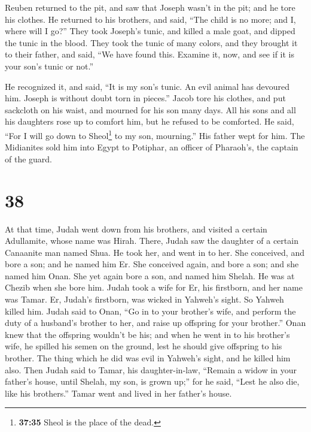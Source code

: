  Reuben returned to the pit, and saw that Joseph wasn't
in the pit; and he tore his clothes.  He returned to his
brothers, and said, ``The child is no more; and I, where will I go?''
 They took Joseph's tunic, and killed a male goat, and
dipped the tunic in the blood.  They took the tunic of
many colors, and they brought it to their father, and said, ``We have
found this. Examine it, now, and see if it is your son's tunic or not.''

 He recognized it, and said, ``It is my son's tunic. An
evil animal has devoured him. Joseph is without doubt torn in pieces.''
 Jacob tore his clothes, and put sackcloth on his waist,
and mourned for his son many days.  All his sons and all
his daughters rose up to comfort him, but he refused to be comforted. He
said, ``For I will go down to Sheol\footnote{\textbf{37:35} Sheol is the
  place of the dead.} to my son, mourning.'' His father wept for him.
 The Midianites sold him into Egypt to Potiphar, an
officer of Pharaoh's, the captain of the guard.

\hypertarget{section-37}{%
\section{38}\label{section-37}}

 At that time, Judah went down from his brothers, and
visited a certain Adullamite, whose name was Hirah. 
There, Judah saw the daughter of a certain Canaanite man named Shua. He
took her, and went in to her.  She conceived, and bore a
son; and he named him Er.  She conceived again, and bore a
son; and she named him Onan.  She yet again bore a son,
and named him Shelah. He was at Chezib when she bore him. 
Judah took a wife for Er, his firstborn, and her name was Tamar.
 Er, Judah's firstborn, was wicked in Yahweh's sight. So
Yahweh killed him.  Judah said to Onan, ``Go in to your
brother's wife, and perform the duty of a husband's brother to her, and
raise up offspring for your brother.''  Onan knew that the
offspring wouldn't be his; and when he went in to his brother's wife, he
spilled his semen on the ground, lest he should give offspring to his
brother.  The thing which he did was evil in Yahweh's
sight, and he killed him also.  Then Judah said to Tamar,
his daughter-in-law, ``Remain a widow in your father's house, until
Shelah, my son, is grown up;'' for he said, ``Lest he also die, like his
brothers.'' Tamar went and lived in her father's house.

